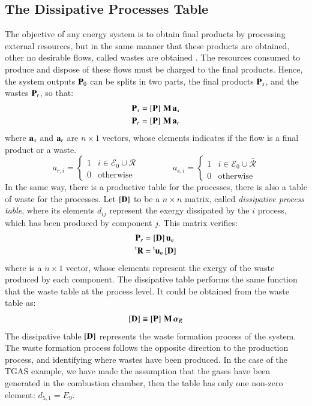 \documentclass{ecos2018}
\begin{document}
\subsection{The Dissipative Processes Table}
The objective of any energy system is to obtain final products by processing external resources, but in the same manner that these products are obtained, other no desirable flows, called wastes are obtained \cite{Residues2007}. The resources consumed to produce and dispose of these flows must be charged to the final products. Hence, the system outputs $\mathbf{P}_0$ can be splits in two parts, the final products $\mathbf{P}_s$, and the wastes $\mathbf{P}_r$, so that:
\begin{align}
\mathbf{P}_s&=\left[ \textbf{P} \right]\,\mathbf{M}\,\mathbf{a}_s \\
\mathbf{P}_r&=\left[ \textbf{P} \right]\,\mathbf{M}\,\mathbf{a}_r 
\end{align}
where $\mathbf{a}_s$ and $\mathbf{a}_r$ are $n \times 1$ vectors, whose elements indicates if the flow is a final product or a waste.
\begin{equation}
a_{r,i}=\begin{cases}
1 & i\in\mathcal{E}_0 \cup \mathcal{R} \\
0 & \text{otherwise}
\end{cases}
\qquad\qquad
a_{s,i}=\begin{cases}
1 & i\in\mathcal{E}_0 \cup \bar{\mathcal{R}} \\
0 & \text{otherwise}
\end{cases}
\end{equation}
In the same way, there is a productive table for the processes, there is also a table of waste for the processes. Let $\left[ \textbf{D} \right]$ to be a $n \times n$ matrix, called \emph{dissipative process table}, where its elements $d_{ij}$ represent the exergy dissipated by the $i$ process, which has been produced by component $j$. This matrix verifies:
\begin {align}
\mathbf{P} _r & = \left[ \textbf{D} \right] \mathbf{u} _n \\
\prescript{\smash{\mathrm{t}}}{}{\mathbf{R}} & = \prescript{\smash{\mathrm{t}}}{}{\mathbf{u}} _n \left[ \textbf{D} \right]
\end {align}
where  is a $n \times 1$ vector, whose elements represent the exergy of the waste produced by each component. The dissipative table performs the same function that the waste table at the process level. It could be obtained from the waste table as:
\begin{equation}
\label{eq:rctfpdd}
\left[ \textbf{D} \right] \equiv \left[ \textbf{P} \right] \, \mathbf{M} \, \bm{\alpha}_R
\end{equation}
The dissipative table $\left[ \textbf{D} \right]$ represents the waste formation process of the system. The waste formation process follows the opposite direction to the production process, and  identifying where wastes have been produced. In the case of the TGAS example, we have made the assumption that the gases have been generated in the combustion chamber, then the table has only one non-zero element: $d_{5,1}= E_9$.
\end{document}
